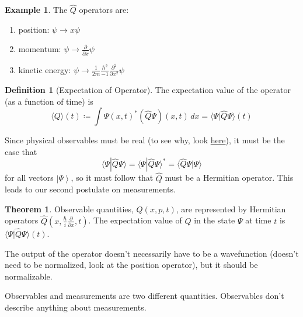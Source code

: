 \documentclass{article}
\newcommand{\ket}[1]{\ensuremath{\left|#1\right\rangle}}
\newcommand{\braket}[2]{\langle #1 | #2 \rangle}
\theoremstyle{definition}
\newtheorem{theorem}{Theorem}[section]
\newtheorem{example}{Example}[section]
\newtheorem{definition}{Definition}[section]
\begin{document}
      \begin{example}
        The $\hat{Q}$ operators are: 
        \begin{enumerate} 
          \item position: $\psi \rightarrow x \psi$ 
          \item momentum: $\psi \rightarrow \frac{\partial}{\partial x} \psi $ 
          \item kinetic energy: $\psi \rightarrow \frac{1}{2m} \frac{\hbar^2}{-1} \frac{\partial^2}{\partial x^2} \psi$
        \end{enumerate}
      \end{example}

      \begin{definition}[Expectation of Operator]
        The expectation value of the operator (as a function of time) is
        \begin{equation} 
          \langle Q \rangle (t) \coloneqq \int \Psi (x, t)^\ast (\hat{Q} \Psi) (x, t) \,dx = \braket{\Psi}{\hat{Q} \Psi}(t)
        \end{equation}
      \end{definition}

      Since physical observables must be real (to see why, look \href{https://physics.stackexchange.com/questions/436462/why-is-there-a-physical-preference-to-real-numbers}{here}), it must be the case that 
      \begin{equation} 
        \braket{\Psi}{\hat{Q} \Psi} = \braket{\Psi}{\hat{Q} \Psi}^\ast = \braket{\hat{Q} \Psi}{\Psi}
      \end{equation}
      for all vectors $\ket{\Psi}$, so it must follow that $\hat{Q}$ must be a Hermitian operator. This leads to our second postulate on measurements. 

      \begin{theorem} 
        Observable quantities, $Q(x, p, t)$, are represented by Hermitian operators $\hat{Q}(x, \frac{\hbar}{i} \frac{\partial}{\partial x}, t)$. The expectation value of $Q$ in the state $\Psi$ at time $t$ is $\braket{\Psi}{\hat{Q} \Psi} (t)$. 
      \end{theorem}
     
      The output of the operator doesn't necessarily have to be a wavefunction (doesn't need to be normalized, look at the position operator), but it should be normalizable. 

      Observables and measurements are two different quantities. Observables don't describe anything about measurements. 
\end{document}
